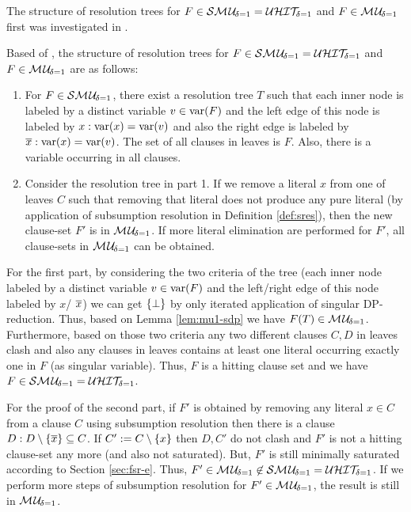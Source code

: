 \documentclass{report}
\begin{document}
The structure of resolution trees for $F \in \mathcal{S}\mathcal{M\hspace{0.8pt}U}_{\!\delta=1}=\mathcal{U}\mathcal{HIT}_{\!\!\delta=1} $ and  $F \in \mathcal{M\hspace{0.8pt}U}_{\!\delta=1}$ first was investigated in \cite{KullmannZhao2016UHitSAT}. 
\begin{lem}\label{lem:mu1-build}
Based of \cite{KullmannZhao2016UHitSAT}, the structure of resolution trees  for $F \in \mathcal{S}\mathcal{M\hspace{0.8pt}U}_{\!\delta=1}=\mathcal{U}\mathcal{HIT}_{\!\!\delta=1} $ and  $F \in \mathcal{M\hspace{0.8pt}U}_{\!\delta=1}$ are as follows:
  \begin{enumerate}
  \item For $F \in \mathcal{S}\mathcal{M\hspace{0.8pt}U}_{\!\delta=1}$, there exist a resolution tree $T$ such that each inner node is labeled by a distinct variable $v \in \operatorname{var}(F)$ and the left edge of this node is labeled by $x: \operatorname{var}(x)=\operatorname{var}(v)$ and also the right edge is labeled by $\overline x: \operatorname{var}(x)=\operatorname{var}(v)$. The set of all clauses in leaves is $F$. Also, there is a variable occurring in all clauses. 
  \item Consider the resolution tree in part 1. If we remove a literal $x$ from one of leaves $C$ such that removing that literal does not produce any pure literal (by application of subsumption resolution in Definition \ref{def:sres}), then the new clause-set $F'$ is in $ \mathcal{M\hspace{0.8pt}U}_{\!\delta=1}$. If more literal elimination are performed for $F'$, all clause-sets in $ \mathcal{M\hspace{0.8pt}U}_{\!\delta=1}$ can be obtained.
  \end{enumerate}
\end{lem}
\begin{prf}
For the first part, by considering the two criteria of the tree (each inner node labeled by a distinct variable $v \in \operatorname{var}(F)$ and the left/right edge of this node labeled by $x$/ $\overline x$) we can get $\{ \bot \}$ by only iterated application of singular DP-reduction. Thus, based on Lemma \ref{lem:mu1-sdp} we have $F(T) \in  \mathcal{M\hspace{0.8pt}U}_{\!\delta=1}$. Furthermore, based on those two criteria any two different clauses $C,D$ in leaves clash and also any clauses in leaves contains at least one literal occurring exactly one in $F$ (as singular variable). Thus, $F$ is a hitting clause set and we have $F \in \mathcal{S}\mathcal{M\hspace{0.8pt}U}_{\!\delta=1}=\mathcal{U}\mathcal{HIT}_{\!\!\delta=1} $.

For the proof of the second part, if $F'$ is obtained by removing any literal $x \in C$ from a clause $C$ using subsumption resolution then there is a clause $D:D \setminus \{ \overline x \} \subseteq C$. If $C':=C \setminus \{ x \}$ then $D,C'$ do not clash and $F'$ is not a hitting clause-set any more (and also not saturated). But, $F'$ is still minimally saturated according to Section \ref{sec:fsr-e}. Thus, $F'\in  \mathcal{M\hspace{0.8pt}U}_{\!\delta=1} \not \in \mathcal{S}\mathcal{M\hspace{0.8pt}U}_{\!\delta=1}=\mathcal{U}\mathcal{HIT}_{\!\!\delta=1}$. If we perform more steps of subsumption resolution for $F'\in  \mathcal{M\hspace{0.8pt}U}_{\!\delta=1}$, the result is still in $ \mathcal{M\hspace{0.8pt}U}_{\!\delta=1}$. %
\end{prf}
\end{document}
